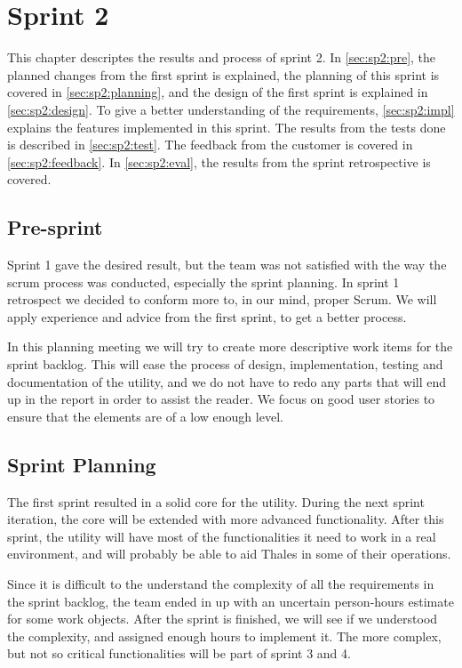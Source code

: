 \chapter{Sprint 2}
This chapter descriptes the results and process of sprint 2. In 
\autoref{sec:sp2:pre}, the planned changes from the first sprint is explained, 
the planning of this sprint is covered in \autoref{sec:sp2:planning}, and the 
design of the first sprint is explained in \autoref{sec:sp2:design}. To give a 
better understanding of the requirements, \autoref{sec:sp2:impl} explains the 
features implemented in this sprint. The results from the tests done is 
described in \autoref{sec:sp2:test}. The feedback from the customer is covered 
in \autoref{sec:sp2:feedback}. In \autoref{sec:sp2:eval}, the results from the 
sprint retrospective is covered.

\section{Pre-sprint}
\label{sec:sp2:pre}
Sprint 1 gave the desired result, but the team was not satisfied with the way the \Gls{scrum} process was conducted, especially the sprint planning. In sprint 1 retrospect we decided to conform more to, in our mind, proper Scrum. We will apply experience and advice from the first sprint, to get a better process. 

In this planning meeting we will try to create more descriptive work items for the sprint backlog. This will ease the process of design, implementation, testing and documentation of the \gls{utility}, and we do not have to redo any parts that will end up in the report in order to assist the reader. We focus on good user stories to ensure that the elements are of a low enough level.


\section{Sprint Planning}
\label{sec:sp2:planning}
The first sprint resulted in a solid core for the \gls{utility}. During the next sprint iteration, the core will be extended with more advanced functionality. After this sprint, the \gls{utility} will have most of the functionalities it need to work in a real environment, and will probably be able to aid Thales in some of their operations.

Since it is difficult to the understand the complexity of all the requirements in the sprint backlog, the team ended in up with an uncertain person-hours estimate for some work objects. After the sprint is finished, we will see if we understood the complexity, and assigned enough hours to implement it. The more complex, but not so critical functionalities will be part of sprint 3 and 4.   

